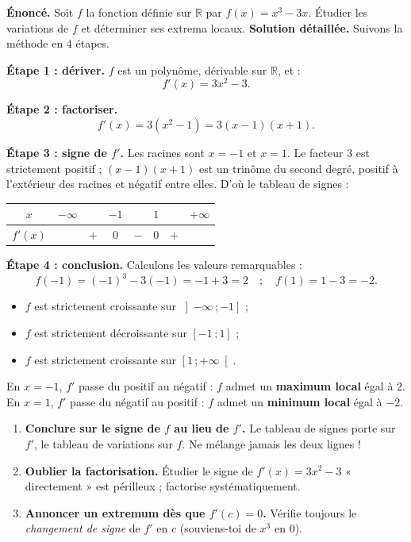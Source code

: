 \documentclass[11pt]{article}
\begin{document}
\begin{exoresolu}[Variations de $f(x) = x^3 - 3x$ sur $\mathbb{R}$]
\textbf{Énoncé.} Soit $f$ la fonction définie sur $\mathbb{R}$ par $f(x) = x^3 - 3x$. Étudier les variations de $f$ et déterminer ses extrema locaux.
\tcblower
\textbf{Solution détaillée.} Suivons la méthode en 4 étapes.

\textbf{Étape 1 : dériver.} $f$ est un polynôme, dérivable sur $\mathbb{R}$, et :
\[ f'(x) = 3x^2 - 3. \]

\textbf{Étape 2 : factoriser.}
\[ f'(x) = 3(x^2 - 1) = 3(x-1)(x+1). \]

\textbf{Étape 3 : signe de $f'$.} Les racines sont $x = -1$ et $x = 1$. Le facteur $3$ est strictement positif ; $(x-1)(x+1)$ est un trinôme du second degré, positif à l'extérieur des racines et négatif entre elles. D'où le tableau de signes :

\begin{center}
\begin{tabular}{|c|ccccccc|}
\hline
$x$ & $-\infty$ & & $-1$ & & $1$ & & $+\infty$ \\
\hline
$f'(x)$ & & $+$ & $0$ & $-$ & $0$ & $+$ & \\
\hline
\end{tabular}
\end{center}

\textbf{Étape 4 : conclusion.} Calculons les valeurs remarquables :
\[ f(-1) = (-1)^3 - 3(-1) = -1 + 3 = 2 \quad ; \quad f(1) = 1 - 3 = -2. \]
\begin{itemize}
\item $f$ est strictement croissante sur $\left]-\infty\,; -1\right]$ ;
\item $f$ est strictement décroissante sur $\left[-1\,; 1\right]$ ;
\item $f$ est strictement croissante sur $\left[1\,; +\infty\right[$.
\end{itemize}
En $x = -1$, $f'$ passe du positif au négatif : $f$ admet un \textbf{maximum local} égal à $2$. En $x = 1$, $f'$ passe du négatif au positif : $f$ admet un \textbf{minimum local} égal à $-2$.
\end{exoresolu}

\begin{attention}
\begin{enumerate}
\item \textbf{Conclure sur le signe de $f$ au lieu de $f'$.} Le tableau de signes porte sur $f'$, le tableau de variations sur $f$. Ne mélange jamais les deux lignes !
\item \textbf{Oublier la factorisation.} Étudier le signe de $f'(x) = 3x^2 - 3$ « directement » est périlleux ; factorise systématiquement.
\item \textbf{Annoncer un extremum dès que $f'(c)=0$.} Vérifie toujours le \emph{changement de signe} de $f'$ en $c$ (souviens-toi de $x^3$ en $0$).
\end{enumerate}
\end{attention}
\end{document}
